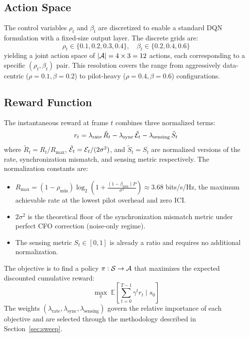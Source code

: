 \subsection{Action Space}

The control variables $\rho_t$ and $\beta_t$ are discretized to enable a standard DQN formulation with a fixed-size output layer. The discrete grids are:
\begin{equation}
    \rho_t \in \{0.1, 0.2, 0.3, 0.4\}, \quad \beta_t \in \{0.2, 0.4, 0.6\}
    \label{eq:action_space}
\end{equation}
yielding a joint action space of $|\mathcal{A}| = 4 \times 3 = 12$ actions, each corresponding to a specific $(\rho_t, \beta_t)$ pair. This resolution covers the range from aggressively data-centric ($\rho=0.1, \beta=0.2$) to pilot-heavy ($\rho=0.4, \beta=0.6$) configurations.

\subsection{Reward Function}

The instantaneous reward at frame $t$ combines three normalized terms:
\begin{equation}
    r_t = \lambda_{\text{rate}}\, \tilde{R}_t - \lambda_{\text{sync}}\, \tilde{\mathcal{E}}_t - \lambda_{\text{sensing}}\, \tilde{S}_t
    \label{eq:reward}
\end{equation}
where $\tilde{R}_t = R_t / R_{\max}$, $\tilde{\mathcal{E}}_t = \mathcal{E}_t / (2\sigma^2)$, and $\tilde{S}_t = S_t$ are normalized versions of the rate, synchronization mismatch, and sensing metric respectively. The normalization constants are:
\begin{itemize}
    \item $R_{\max} = (1-\rho_{\min})\log_2\!\left(1 + \frac{(1-\beta_{\min})P}{\sigma^2}\right) \approx 3.68$ bits/s/Hz, the maximum achievable rate at the lowest pilot overhead and zero ICI.
    \item $2\sigma^2$ is the theoretical floor of the synchronization mismatch metric under perfect CFO correction (noise-only regime).
    \item The sensing metric $S_t \in [0,1]$ is already a ratio and requires no additional normalization.
\end{itemize}
The objective is to find a policy $\pi: \mathcal{S} \to \mathcal{A}$ that maximizes the expected discounted cumulative reward:
\begin{equation}
    \max_\pi\; \mathbb{E}\!\left[\sum_{t=0}^{T-1} \gamma^t r_t \;\Big|\; s_0\right]
    \label{eq:mdp_objective}
\end{equation}
The weights $(\lambda_{\text{rate}}, \lambda_{\text{sync}}, \lambda_{\text{sensing}})$ govern the relative importance of each objective and are selected through the methodology described in Section~\ref{sec:sweep}.


